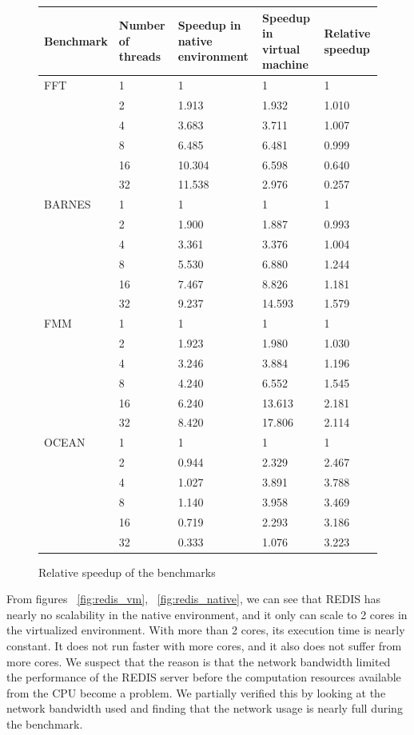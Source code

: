 \begin{figure}[here]
	\center
	\begin{tabular}{ l | p{2cm} | p{3cm} | p{3cm} | l }
		Benchmark & Number of threads & Speedup in native environment & Speedup in virtual machine & Relative speedup \\
	\hline
FFT & 1 &	1	&	1	&	1	\\
	&	2	&	1.913	&	1.932	&	1.010	\\
	&	4	&	3.683	&	3.711	&	1.007	\\
	&	8	&	6.485	&	6.481	&	0.999	\\
	&	16	&	10.304	&	6.598	&	0.640	\\
	&	32	&	11.538	&	2.976	&	0.257	\\
	\hline
BARNES	&	1	&	1	&	1	&	1	\\
	&	2	&	1.900	&	1.887	&	0.993	\\
	&	4	&	3.361	&	3.376	&	1.004	\\
	&	8	&	5.530	&	6.880	&	1.244	\\
	&	16	&	7.467	&	8.826	&	1.181	\\
	&	32	&	9.237	&	14.593	&	1.579	\\
	\hline
FMM	&	1	&	1	&	1	&	1	\\
	&	2	&	1.923	&	1.980	&	1.030	\\
	&	4	&	3.246	&	3.884	&	1.196	\\
	&	8	&	4.240	&	6.552	&	1.545	\\
	&	16	&	6.240	&	13.613	&	2.181	\\
	&	32	&	8.420	&	17.806	&	2.114	\\
	\hline
OCEAN	&	1	&	1	&	1	&	1	\\
	&	2	&	0.944	&	2.329	&	2.467	\\
	&	4	&	1.027	&	3.891	&	3.788	\\
	&	8	&	1.140	&	3.958	&	3.469	\\
	&	16	&	0.719	&	2.293	&	3.186	\\
	&	32	&	0.333	&	1.076	&	3.223	\\
\end{tabular}
\caption{Relative speedup of the benchmarks}
\label{fig:relspeedup}
\end{figure}

From figures ~\ref{fig:redis_vm}, ~\ref{fig:redis_native}, we can see
that REDIS has nearly no scalability in the native environment, and it
only can scale to 2 cores in the virtualized environment. With more than
2 cores, its execution time is nearly constant. It does not run faster
with more cores, and it also does not suffer from more cores. We suspect
that the reason is that the network bandwidth limited the performance
of the REDIS server before the computation resources available from the
CPU become a problem. We partially verified this by looking at the network
bandwidth used and finding that the network usage is nearly full during
the benchmark.

